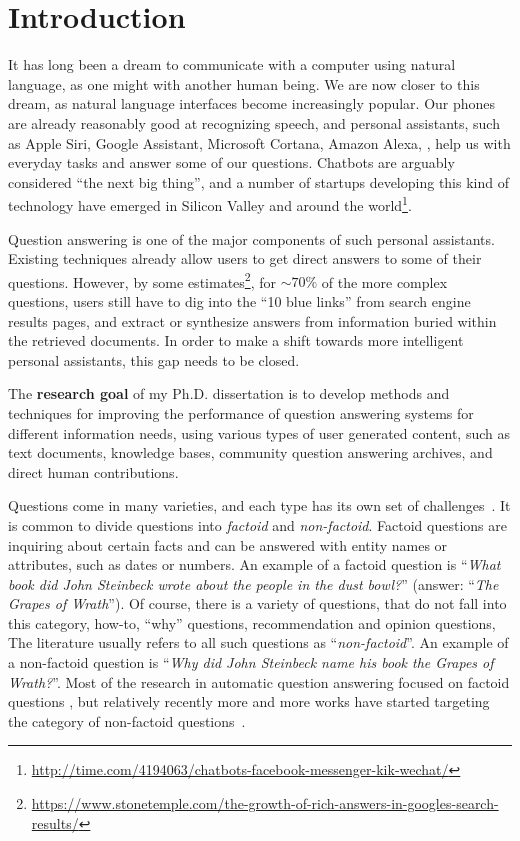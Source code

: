 \chapter{Introduction}
\setcounter{page}{1}

It has long been a dream to communicate with a computer using natural language, as one might with another human being.
We are now closer to this dream, as natural language interfaces become increasingly popular.
Our phones are already reasonably good at recognizing speech, and personal assistants, such as Apple Siri, Google Assistant, Microsoft Cortana, Amazon Alexa, \etc, help us with everyday tasks and answer some of our questions.
Chatbots are arguably considered ``the next big thing'', and a number of startups developing this kind of technology have emerged in Silicon Valley and around the world\footnote{\href{url}{http://time.com/4194063/chatbots-facebook-messenger-kik-wechat/}}.

Question answering is one of the major components of such personal assistants.
Existing techniques already allow users to get direct answers to some of their questions.
However, by some estimates\footnote{\href{url}{https://www.stonetemple.com/the-growth-of-rich-answers-in-googles-search-results/}}, for $\sim 70\%$ of the more complex questions, users still have to dig into the ``10 blue links'' from search engine results pages, and extract or synthesize answers from information buried within the retrieved documents.
In order to make a shift towards more intelligent personal assistants, this gap needs to be closed.

The \textbf{research goal} of my Ph.D. dissertation is to develop methods and techniques for improving the performance of question answering systems for different information needs, using various types of user generated content, such as text documents, knowledge bases, community question answering archives, and direct human contributions.

Questions come in many varieties, and each type has its own set of challenges~\cite{voorhees2001trec,yang2016beyond}.
It is common to divide questions into \textit{factoid} and \textit{non-factoid}.
Factoid questions are inquiring about certain facts and can be answered with entity names or attributes, such as dates or numbers.
An example of a factoid question is ``\textit{What book did John Steinbeck wrote about the people in the dust bowl?}'' (answer: ``\textit{The Grapes of Wrath}'').
Of course, there is a variety of questions, that do not fall into this category, \eg how-to, ``why'' questions, recommendation and opinion questions, \etc
The literature usually refers to all such questions as ``\textit{non-factoid}''.
An example of a non-factoid question is ``\textit{Why did John Steinbeck name his book the Grapes of Wrath?}''.
Most of the research in automatic question answering focused on factoid questions \cite{BerantCFL13:sempre,Cafarella:2008:WEP:1453856.1453916,voorhees2001trec,lin2007exploration}, but relatively recently more and more works have started targeting the category of non-factoid questions~\cite{overviewliveqa15,cohen2016end,fried2015higher,sharp2015spinning,surdeanu2011learning,tymoshenko2016learning,yang2016beyond}.

